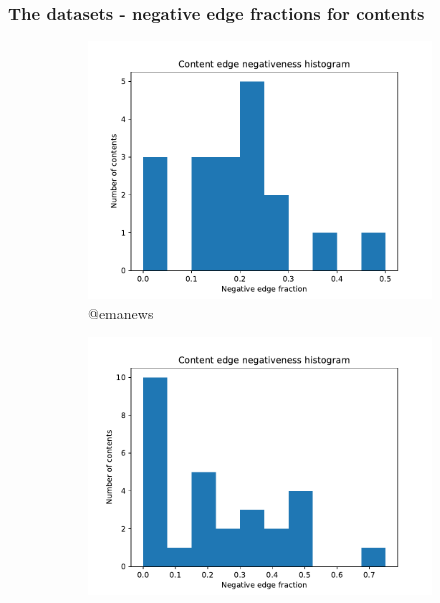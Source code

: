 \documentclass{beamer}
\begin{document}
\begin{frame}[c]
	\frametitle{The datasets - negative edge fractions for contents}
	\begin{figure}
		\begin{center}
			\begin{subfigure}[b]{0.4\textwidth}
				\centering
				\includegraphics[width=\textwidth]{out/emanews200/neg-fraction-content-hist.pdf}
				\caption{@emanews}
				\label{fig:out/emanews200/neg-fraction-content-hist.pdf}
			\end{subfigure}
			\begin{subfigure}[b]{0.4\textwidth}
				\centering
				\includegraphics[width=\textwidth]{out/bbcscience200/neg-fraction-content-hist.pdf}

\end{subfigure}
\end{center}
\end{figure}
\end{frame}
\end{document}
